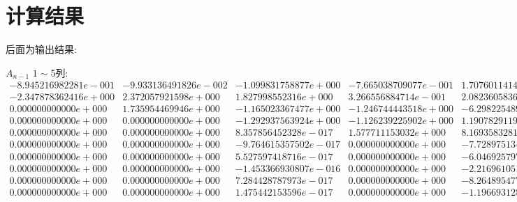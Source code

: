 \chapter{计算结果}
后面为输出结果:
\newpage
\begin{landscape}
\small

$A_{n-1}$
$1\sim$5列:
\[
\begin{matrix}
-8.945216982281e-001 & -9.933136491826e-002 & -1.099831758877e+000 & -7.665038709077e-001 & 1.707601141456e-001\\-2.347878362416e+000 & 2.372057921598e+000 & 1.827998552316e+000 & 3.266556884714e-001 & 2.082360583635e-001\\0.000000000000e+000 & 1.735954469946e+000 & -1.165023367477e+000 & -1.246744443518e+000 & -6.298225489084e-001\\0.000000000000e+000 & 0.000000000000e+000 & -1.292937563924e+000 & -1.126239225902e+000 & 1.190782911924e+000\\0.000000000000e+000 & 0.000000000000e+000 & 8.357856452328e-017 & 1.577711153032e+000 & 8.169358328160e-001\\0.000000000000e+000 & 0.000000000000e+000 & -9.764615357502e-017 & 0.000000000000e+000 & -7.728975134989e-001\\0.000000000000e+000 & 0.000000000000e+000 & 5.527597418716e-017 & 0.000000000000e+000 & -6.046925797698e-017\\0.000000000000e+000 & 0.000000000000e+000 & -1.453366930807e-016 & 0.000000000000e+000 & -2.216961051353e-017\\0.000000000000e+000 & 0.000000000000e+000 & 7.284428787973e-017 & 0.000000000000e+000 & -8.264895477591e-018\\0.000000000000e+000 & 0.000000000000e+000 & 1.475442153596e-017 & 0.000000000000e+000 & -1.196693128035e-016\\
\end{matrix}\]


\end{landscape}
